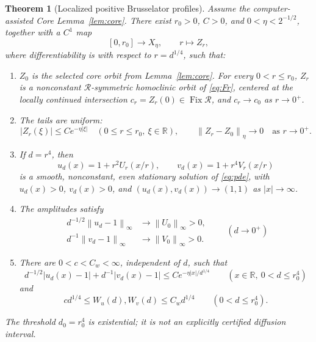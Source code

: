\documentclass[11pt,reqno]{amsart}
\numberwithin{equation}{section}
\newtheorem{theorem}{Theorem}[section]
\theoremstyle{remark}
\newcommand{\R}{\mathbb R}
\newcommand{\Fix}{\operatorname{Fix}}
\newcommand{\cR}{\mathcal R}
\newcommand{\norm}[1]{\left\lVert #1\right\rVert}
\begin{document}
\begin{theorem}[Localized positive Brusselator profiles]\label{thm:main}
Assume the computer-assisted Core Lemma~\ref{lem:core}.  There exist
$r_0>0$, $C>0$, and $0<\eta<2^{-1/2}$, together with a $C^1$ map
\[
 [0,r_0]\longrightarrow X_\eta,\qquad r\longmapsto Z_r,
\]
where differentiability is with respect to $r=d^{1/4}$, such that:
\begin{enumerate}
\item $Z_0$ is the selected core orbit from Lemma~\ref{lem:core}.  For
every $0<r\le r_0$, $Z_r$ is a nonconstant $\cR$-symmetric homoclinic
orbit of \eqref{eq:Fr}, centered at the locally continued intersection
$c_r=Z_r(0)\in\Fix\cR$, and $c_r\to c_0$ as $r\to0^+$.
\item The tails are uniform:
\begin{equation}\label{eq:uniform-tail}
 |Z_r(\xi)|\le Ce^{-\eta|\xi|}
 \quad(0\le r\le r_0,\ \xi\in\R),
 \qquad \norm{Z_r-Z_0}_\eta\longrightarrow0
 \quad\text{as }r\to0^+.
\end{equation}
\item If $d=r^4$, then
\begin{equation}\label{eq:inverse-scaling}
 u_d(x)=1+r^2U_r(x/r),\qquad
 v_d(x)=1+r^4V_r(x/r)
\end{equation}
is a smooth, nonconstant, even stationary solution of \eqref{eq:pde}, with
$u_d(x)>0$, $v_d(x)>0$, and $(u_d(x),v_d(x))\to(1,1)$ as
$|x|\to\infty$.
\item The amplitudes satisfy
\begin{equation}\label{eq:amplitude-limits}
 \begin{aligned}
 d^{-1/2}\norm{u_d-1}_\infty&\longrightarrow\norm{U_0}_\infty>0,\\
 d^{-1}\norm{v_d-1}_\infty&\longrightarrow\norm{V_0}_\infty>0.
 \end{aligned}
 \qquad(d\to0^+)
\end{equation}
\item There are $0<c<C_w<\infty$, independent of $d$, such that
\begin{equation}\label{eq:physical-localization}
 d^{-1/2}|u_d(x)-1|+d^{-1}|v_d(x)-1|
 \le Ce^{-\eta|x|/d^{1/4}}
 \qquad(x\in\R,\ 0<d\le r_0^4)
\end{equation}
and
\begin{equation}\label{eq:width-law}
 c d^{1/4}\le W_u(d),W_v(d)\le C_wd^{1/4}
 \qquad(0<d\le r_0^4).
\end{equation}
\end{enumerate}
The threshold $d_0=r_0^4$ is existential; it is not an explicitly certified
diffusion interval.
\end{theorem}
\end{document}
